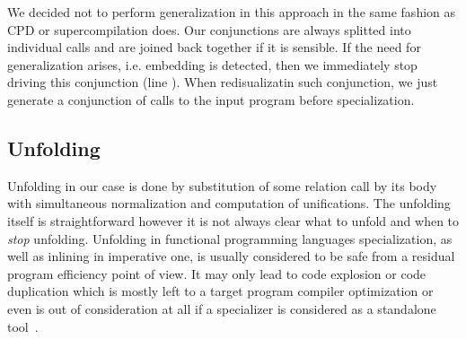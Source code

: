 We decided not to perform generalization in this approach in the same fashion as CPD or supercompilation does.
Our conjunctions are always splitted into individual calls and are joined back together if it is sensible.
If the need for generalization arises, i.e. embedding is detected, then we immediately stop driving this conjunction (line ).
When redisualizatin such conjunction, we just generate a conjunction of calls to the input program before specialization.




\subsection{Unfolding}

Unfolding in our case is done by substitution of some relation call by its body with simultaneous normalization and computation of unifications.
The unfolding itself is straightforward however it is not always clear what to unfold and when to \emph{stop} unfolding.
Unfolding in functional programming languages specialization, as well as inlining in imperative one, is usually considered to be safe from a residual program efficiency point of view.
It may only lead to code explosion or code duplication which is mostly left to a target program compiler optimization or even is out of consideration at all if a specializer is considered as a standalone tool~\cite{jonesbook}.

